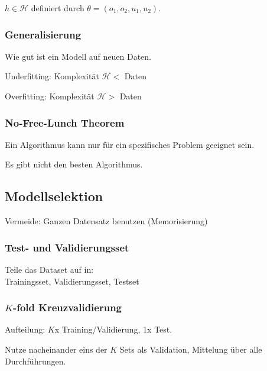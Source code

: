 $h\in\mathcal{H}$ definiert durch $\theta=(o_1,o_2,u_1,u_2)$.

\subsubsection*{Generalisierung}
Wie gut ist ein Modell auf neuen Daten.

Underfitting: Komplexität $\mathcal{H} <$ Daten

Overfitting: Komplexität $\mathcal{H} >$ Daten

\subsubsection*{No-Free-Lunch Theorem}
Ein Algorithmus kann nur für ein spezifisches Problem geeignet sein.

Es gibt nicht den besten Algorithmus.

\subsection*{Modellselektion}
Vermeide: Ganzen Datensatz benutzen (Memorisierung)

\subsubsection*{Test- und Validierungsset}
Teile das Dataset auf in:\\
Trainingsset, Validierungsset, Testset

\subsubsection*{$K$-fold Kreuzvalidierung}
Aufteilung: $K$x Training/Validierung, 1x Test.

Nutze nacheinander eins der $K$ Sets als Validation, Mittelung über alle Durchführungen.
